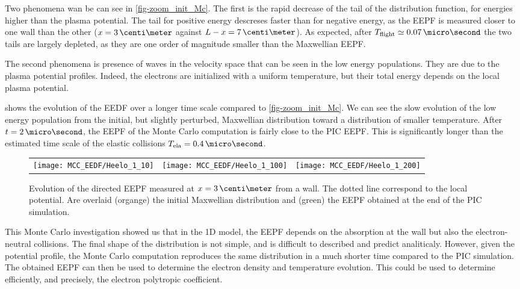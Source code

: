 Two phenomena wan be can see in \cref{fig-zoom_init_Mc}.
The first is the rapid decrease of the tail of the distribution function, for energies higher than the plasma potential.
The tail for positive energy descreses faster than for negative energy, as the EEPF is measured closer to one wall than the other ($x=3\,\centi\meter$ against $L-x=7\,\centi\meter$).
As expected, after $ T_{\rm flight}\simeq 0.07\,\micro\second$ the two tails are largely depleted, as they are one order of magnitude smaller than the Maxwellian EEPF.

The second phenomena is presence of  waves in the velocity space that can be seen in the low energy populations.
They are due to the plasma potential profiles.
Indeed, the electrons are initialized with a uniform temperature, but their total energy depends on the local plasma potential. 

 shows the evolution of the EEDF over a longer time scale compared to \cref{fig-zoom_init_Mc}.
We can see the slow evolution of the low energy population from the initial, but slightly perturbed, Maxwellian distribution toward a distribution of smaller temperature.
After $t=2\,\micro\second$, the EEPF of the Monte Carlo computation is fairly close to the \ac{PIC} EEPF.
This is significantly longer than the estimated time scale of the elastic collisions ${T_{\rm ela}  = 0.4 \,\micro\second }$.

\begin{figure}
  \begin{tabular}{ccc}
    \texttt{[image: MCC\_EEDF/Heelo\_1\_10]} &
    \texttt{[image: MCC\_EEDF/Heelo\_1\_100]} &
    \texttt{[image: MCC\_EEDF/Heelo\_1\_200]} \\
  \end{tabular}
  \caption{Evolution of the directed EEPF measured at $x=3\,\centi\meter$ from a wall. The dotted line correspond to the local potential. Are overlaid (organge) the initial Maxwellian distribution and (green) the EEPF obtained at the end of the \ac{PIC} simulation. }
  \label{fig-zoom_Mc_later}
\end{figure}

\vspace{1em}
This Monte Carlo investigation showed us that in the \ac{1D} model, the EEPF depends on the absorption at the wall but also the electron-neutral collisions.
The final shape of the distribution is not simple, and is difficult to described and predict analiticaly.
However, given the potential profile, the Monte Carlo computation reproduces the same distribution in a much shorter time compared to the \ac{PIC} simulation. 
The obtained EEPF can then be used to determine the electron density and temperature evolution.
This could be used to determine efficiently, and precisely, the electron polytropic coefficient.